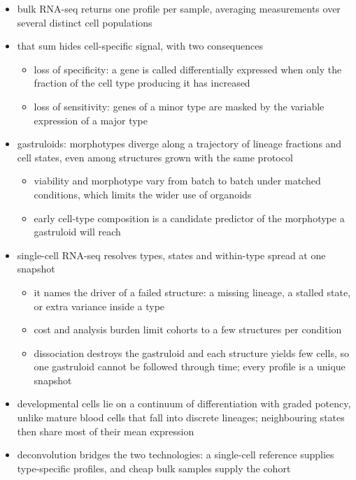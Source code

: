 \documentclass[pdflatex, sn-nature]{sn-jnl}
\theoremstyle{thmstyleone}%
\theoremstyle{thmstyletwo}%
\theoremstyle{thmstylethree}%
\begin{document}
\begin{itemize}
  \item bulk RNA-seq returns one profile per sample, averaging
  measurements over several distinct cell populations
  \item that sum hides cell-specific signal, with two consequences
  \begin{itemize}
    \item loss of specificity: a gene is called differentially expressed when only the
          fraction of the cell type producing it has increased
    \item loss of sensitivity: genes of a minor type are masked by the variable expression
          of a major type
  \end{itemize}
  \item gastruloids: morphotypes diverge along a trajectory of lineage fractions
        and cell states, even among structures grown with the same protocol
        \cite{suppingerMultimodalCharacterizationMurine2023}
  \begin{itemize}
    \item viability and morphotype vary from batch to batch under matched conditions,
          which limits the wider use of organoids
    \item early cell-type composition is a candidate predictor of the morphotype a
          gastruloid will reach
  \end{itemize}
  \item single-cell RNA-seq resolves types, states and within-type spread at one snapshot
  \begin{itemize}
    \item it names the driver of a failed structure: a missing lineage, a stalled state,
          or extra variance inside a type
    \item cost and analysis burden limit cohorts to a few structures per condition
    \item dissociation destroys the gastruloid and each structure yields few cells, so one
          gastruloid cannot be followed through time; every profile is a unique snapshot
  \end{itemize}
  \item developmental cells lie on a continuum of differentiation with graded potency,
        unlike mature blood cells that fall into discrete lineages; neighbouring states
        then share most of their mean expression
  \item deconvolution bridges the two technologies: a single-cell reference supplies
        type-specific profiles, and cheap bulk samples supply the cohort
\end{itemize}
\end{document}
